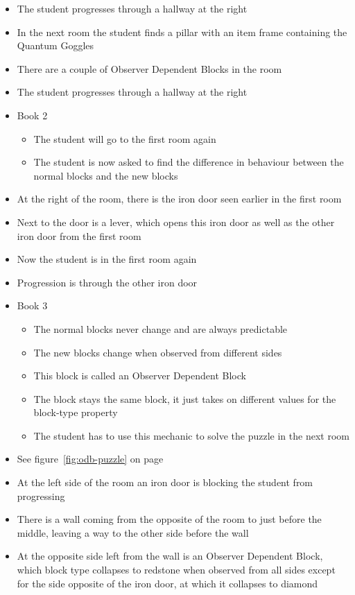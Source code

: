\documentclass[11pt,twoside]{report} %
\begin{document}
\begin{itemize}
	\item The student progresses through a hallway at the right
	\item In the next room the student finds a pillar with an item frame containing the Quantum Goggles
	\item There are a couple of Observer Dependent Blocks in the room
	\item The student progresses through a hallway at the right
	\item Book 2
	\begin{itemize}
		\item The student will go to the first room again
		\item The student is now asked to find the difference in behaviour between the normal blocks and the new blocks
	\end{itemize}
	\item At the right of the room, there is the iron door seen earlier in the first room
	\item Next to the door is a lever, which opens this iron door as well as the other iron door from the first room
	\item Now the student is in the first room again
	\item Progression is through the other iron door
	\item Book 3
	\begin{itemize}
		\item The normal blocks never change and are always predictable
		\item The new blocks change when observed from different sides
		\item This block is called an Observer Dependent Block
		\item The block stays the same block, it just takes on different values for the block-type property
		\item The student has to use this mechanic to solve the puzzle in the next room
	\end{itemize}
	\item See figure~\ref{fig:odb-puzzle} on page~\pageref{fig:odb-puzzle}
	\item At the left side of the room an iron door is blocking the student from progressing
	\item There is a wall coming from the opposite of the room to just before the middle, leaving a way to the other side before the wall
	\item At the opposite side left from the wall is an Observer Dependent Block, which block type collapses to redstone when observed from all sides except for the side opposite of the iron door, at which it collapses to diamond

\end{itemize}
\end{document}
